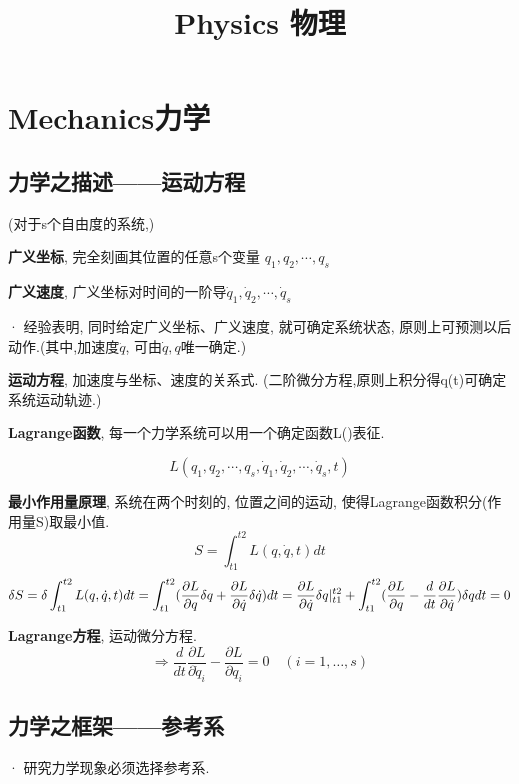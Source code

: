 \documentclass{article}
\title{Physics 物理}\author{}\date{}
\newcommand{\defi}[2]{\textbf{#1}, #2}
\begin{document}
\maketitle
\tableofcontents


\section{Mechanics力学}
    \subsection{力学之描述——运动方程}
        (对于s个自由度的系统,)
        
        \defi{广义坐标}{完全刻画其位置的任意s个变量 $q_{1},q_{2},\cdots,q_{s}$}
        
        \defi{广义速度}{广义坐标对时间的一阶导$\dot q_{1},\dot q_{2},\cdots,\dot q_{s}$}
        
        · 经验表明, 同时给定广义坐标、广义速度, 就可确定系统状态, 原则上可预测以后动作.(其中,加速度$\ddot q$, 可由$\dot q,q$唯一确定.)
        
        \defi{运动方程}{加速度与坐标、速度的关系式. (二阶微分方程,原则上积分得q(t)可确定系统运动轨迹.)}
        
        \defi{Lagrange函数}{每一个力学系统可以用一个确定函数L()表征.}
        
        $$L(q_{1},q_{2},\cdots,q_{s},\dot q_{1},\dot q_{2},\cdots,\dot q_{s},t)$$
        
        \defi{最小作用量原理}{系统在两个时刻的, 位置之间的运动, 使得Lagrange函数积分(作用量S)取最小值.
            $$S = \int_{t1}^{t2} L(q,\dot q,t)dt$$
            $$\delta S = \delta \int_{t1}^{t2} L(q,\dot q,t)dt = \int_{t1}^{t2} (\frac{\partial L}{\partial q}\delta q + \frac{\partial L}{\partial \dot q}\delta \dot q) dt = \frac{\partial L}{\partial \dot q} \delta q \arrowvert_{t1}^{t2} + \int_{t1}^{t2} (\frac{\partial L}{\partial q} - \frac{d}{dt} \frac{\partial L}{\partial \dot q}) \delta q dt = 0$$
        }
        
        \defi{Lagrange方程}{运动微分方程.
            $$\Rightarrow \frac{d}{dt}\frac{\partial L}{\partial \dot q_i} - \frac{\partial L}{\partial q_i} = 0\quad(i=1,\dots,s)$$
        }


    \subsection{力学之框架——参考系}
        · 研究力学现象必须选择参考系.
        
\end{document}
